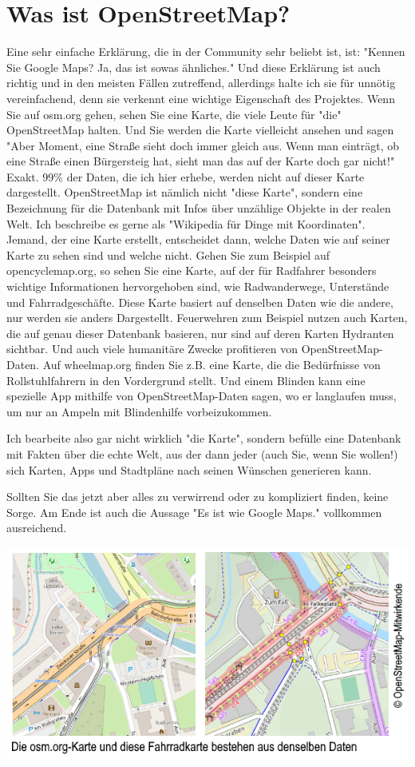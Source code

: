 \documentclass[10pt,foldmark,notumble]{leaflet}
\begin{document}
    \section{Was ist OpenStreetMap?}
    Eine sehr einfache Erklärung, die in der Community sehr beliebt ist, ist: "Kennen Sie Google Maps? Ja, das ist sowas ähnliches." Und diese Erklärung ist auch richtig und in den meisten Fällen zutreffend, allerdings halte ich sie für unnötig vereinfachend, denn sie verkennt eine wichtige Eigenschaft des Projektes. Wenn Sie auf osm.org gehen, sehen Sie eine Karte, die viele Leute für "die" OpenStreetMap halten. Und Sie werden die Karte vielleicht ansehen und sagen "Aber Moment, eine Straße sieht doch immer gleich aus. Wenn man einträgt, ob eine Straße einen Bürgersteig hat, sieht man das auf der Karte doch gar nicht!" Exakt. 99\% der Daten, die ich hier erhebe, werden nicht auf dieser Karte dargestellt. OpenStreetMap ist nämlich nicht "diese Karte", sondern eine Bezeichnung für die Datenbank mit Infos über unzählige Objekte in der realen Welt. Ich beschreibe es gerne als "Wikipedia für Dinge mit Koordinaten". Jemand, der eine Karte erstellt, entscheidet dann, welche Daten wie auf seiner Karte zu sehen sind und welche nicht. Gehen Sie zum Beispiel auf opencyclemap.org, so sehen Sie eine Karte, auf der für Radfahrer besonders wichtige Informationen hervorgehoben sind, wie Radwanderwege, Unterstände und Fahrradgeschäfte. Diese Karte basiert auf denselben Daten wie die andere, nur werden sie anders Dargestellt. Feuerwehren zum Beispiel nutzen auch Karten, die auf genau dieser Datenbank basieren, nur sind auf deren Karten Hydranten sichtbar. Und auch viele humanitäre Zwecke profitieren von OpenStreetMap-Daten. Auf wheelmap.org finden Sie z.B. eine Karte, die die Bedürfnisse von Rollstuhlfahrern in den Vordergrund stellt. Und einem Blinden kann eine spezielle App mithilfe von OpenStreetMap-Daten sagen, wo er langlaufen muss, um nur an Ampeln mit Blindenhilfe vorbeizukommen.

    Ich bearbeite also gar nicht wirklich "die Karte", sondern befülle eine Datenbank mit Fakten über die echte Welt, aus der dann jeder (auch Sie, wenn Sie wollen!) sich Karten, Apps und Stadtpläne nach seinen Wünschen generieren kann.

    Sollten Sie das jetzt aber alles zu verwirrend oder zu kompliziert finden, keine Sorge. Am Ende ist auch die Aussage "Es ist wie Google Maps." vollkommen ausreichend.

    \includegraphics[width=\linewidth]{karte.png}
\end{document}
